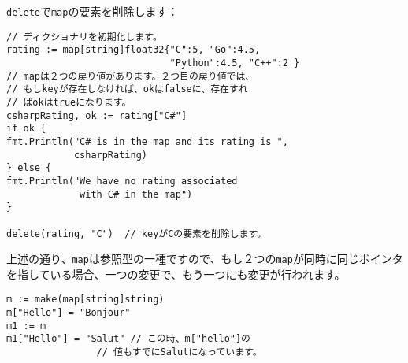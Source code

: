 \texttt{delete}で\texttt{map}の要素を削除します：

\begin{lstlisting}[numbers=none]
// ディクショナリを初期化します。
rating := map[string]float32{"C":5, "Go":4.5,
                             "Python":4.5, "C++":2 }
// mapは２つの戻り値があります。２つ目の戻り値では、
// もしkeyが存在しなければ、okはfalseに、存在すれ
// ばokはtrueになります。
csharpRating, ok := rating["C#"]
if ok {
fmt.Println("C# is in the map and its rating is ",
            csharpRating)
} else {
fmt.Println("We have no rating associated
             with C# in the map")
}

delete(rating, "C")  // keyがCの要素を削除します。
\end{lstlisting}

上述の通り、\texttt{map}は参照型の一種ですので、もし２つの\texttt{map}が同時に同じポインタを指している場合、一つの変更で、もう一つにも変更が行われます。

\begin{lstlisting}[numbers=none]
m := make(map[string]string)
m["Hello"] = "Bonjour"
m1 := m
m1["Hello"] = "Salut" // この時、m["hello"]の
                // 値もすでにSalutになっています。
\end{lstlisting}




